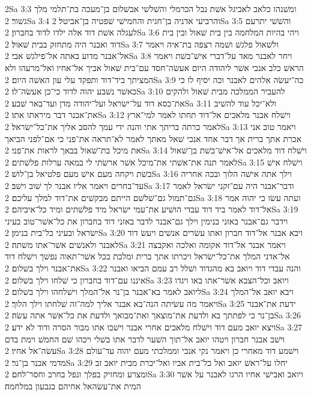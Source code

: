 2Sa 3:3  ומשׁנהו כלאב לאביגל אשׁת נבל הכרמלי והשׁלשׁי אבשׁלום בן־מעכה בת־תלמי מלך גשׁור׃
2Sa 3:4  והרביעי אדניה בן־חגית והחמישׁי שׁפטיה בן־אביטל׃
2Sa 3:5  והשׁשׁי יתרעם לעגלה אשׁת דוד אלה ילדו לדוד בחברון׃
2Sa 3:6  ויהי בהיות המלחמה בין בית שׁאול ובין בית דוד ואבנר היה מתחזק בבית שׁאול׃
2Sa 3:7  ולשׁאול פלגשׁ ושׁמה רצפה בת־איה ויאמר אל־אבנר מדוע באתה אל־פילגשׁ אבי׃
2Sa 3:8  ויחר לאבנר מאד על־דברי אישׁ־בשׁת ויאמר הראשׁ כלב אנכי אשׁר ליהודה היום אעשׂה־חסד עם־בית שׁאול אביך אל־אחיו ואל־מרעהו ולא המציתך ביד־דוד ותפקד עלי עון האשׁה היום׃
2Sa 3:9  כה־יעשׂה אלהים לאבנר וכה יסיף לו כי כאשׁר נשׁבע יהוה לדוד כי־כן אעשׂה־לו׃
2Sa 3:10  להעביר הממלכה מבית שׁאול ולהקים את־כסא דוד על־ישׂראל ועל־יהודה מדן ועד־באר שׁבע׃
2Sa 3:11  ולא־יכל עוד להשׁיב את־אבנר דבר מיראתו אתו׃
2Sa 3:12  וישׁלח אבנר מלאכים אל־דוד תחתו לאמר למי־ארץ לאמר כרתה בריתך אתי והנה ידי עמך להסב אליך את־כל־ישׂראל׃
2Sa 3:13  ויאמר טוב אני אכרת אתך ברית אך דבר אחד אנכי שׁאל מאתך לאמר לא־תראה את־פני כי אם־לפני הביאך את מיכל בת־שׁאול בבאך לראות את־פני׃
2Sa 3:14  וישׁלח דוד מלאכים אל־אישׁ־בשׁת בן־שׁאול לאמר תנה את־אשׁתי את־מיכל אשׁר ארשׂתי לי במאה ערלות פלשׁתים׃
2Sa 3:15  וישׁלח אישׁ בשׁת ויקחה מעם אישׁ מעם פלטיאל בן־לושׁ׃
2Sa 3:16  וילך אתה אישׁה הלוך ובכה אחריה עד־בחרים ויאמר אליו אבנר לך שׁוב וישׁב׃
2Sa 3:17  ודבר־אבנר היה עם־זקני ישׂראל לאמר גם־תמול גם־שׁלשׁם הייתם מבקשׁים את־דוד למלך עליכם׃
2Sa 3:18  ועתה עשׂו כי יהוה אמר אל־דוד לאמר ביד דוד עבדי הושׁיע את־עמי ישׂראל מיד פלשׁתים ומיד כל־איביהם׃
2Sa 3:19  וידבר גם־אבנר באזני בנימין וילך גם־אבנר לדבר באזני דוד בחברון את כל־אשׁר־טוב בעיני ישׂראל ובעיני כל־בית בנימן׃
2Sa 3:20  ויבא אבנר אל־דוד חברון ואתו עשׂרים אנשׁים ויעשׂ דוד לאבנר ולאנשׁים אשׁר־אתו משׁתה׃
2Sa 3:21  ויאמר אבנר אל־דוד אקומה ואלכה ואקבצה אל־אדני המלך את־כל־ישׂראל ויכרתו אתך ברית ומלכת בכל אשׁר־תאוה נפשׁך וישׁלח דוד את־אבנר וילך בשׁלום׃
2Sa 3:22  והנה עבדי דוד ויואב בא מהגדוד ושׁלל רב עמם הביאו ואבנר איננו עם־דוד בחברון כי שׁלחו וילך בשׁלום׃
2Sa 3:23  ויואב וכל־הצבא אשׁר־אתו באו ויגדו ליואב לאמר בא־אבנר בן־נר אל־המלך וישׁלחהו וילך בשׁלום׃
2Sa 3:24  ויבא יואב אל־המלך ויאמר מה עשׂיתה הנה־בא אבנר אליך למה־זה שׁלחתו וילך הלוך׃
2Sa 3:25  ידעת את־אבנר בן־נר כי לפתתך בא ולדעת את־מוצאך ואת־מבואך ולדעת את כל־אשׁר אתה עשׂה׃
2Sa 3:26  ויצא יואב מעם דוד וישׁלח מלאכים אחרי אבנר וישׁבו אתו מבור הסרה ודוד לא ידע׃
2Sa 3:27  וישׁב אבנר חברון ויטהו יואב אל־תוך השׁער לדבר אתו בשׁלי ויכהו שׁם החמשׁ וימת בדם עשׂה־אל אחיו׃
2Sa 3:28  וישׁמע דוד מאחרי כן ויאמר נקי אנכי וממלכתי מעם יהוה עד־עולם מדמי אבנר בן־נר׃
2Sa 3:29  יחלו על־ראשׁ יואב ואל כל־בית אביו ואל־יכרת מבית יואב זב ומצרע ומחזיק בפלך ונפל בחרב וחסר־לחם׃
2Sa 3:30  ויואב ואבישׁי אחיו הרגו לאבנר על אשׁר המית את־עשׂהאל אחיהם בגבעון במלחמה׃

